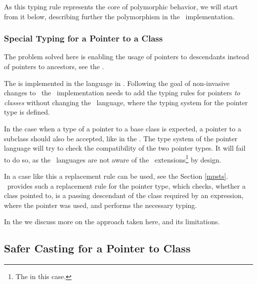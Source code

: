 As this typing rule represents the core of polymorphic behavior, we will start from it below, describing further the
polymorphism in the \pcpp\ implementation.

\subsubsection{Special Typing for a Pointer to a Class}
\label{pointertoclasstyping}

The problem solved here is enabling the usage of pointers to descendants instead of pointers to ancestors, see the
.


The   is implemented in the  language in \mbdr. 
Following the goal of non-invasive changes to \mbeddr\ the \pcpp\ implementation needs to add the 
typing rules for pointers \emph{to classes} without changing the    \mbdr\ language, where the 
typing system for the pointer type is defined.

In the case when a type of a pointer to a base class is expected, a pointer to a subclass should also be accepted, like
in the . The type system of the pointer language will try to check the compatibility of the two pointer types. It will
fail to do so, as the \mbdr\ languages are not aware of the \pcpp\ extensions\footnote{The   in this case.} 
by design.

In a case like this a replacement rule can be used, see the Section \ref{mpsts}. \pcpp\ provides such a replacement rule for the 
pointer type, which checks, whether a class pointed to, is a passing descendant of the class required by an expression, 
where the pointer was used, and performs the necessary typing.

In the  we discuss more on the approach taken here, and its limitations.

\subsection{Safer Casting for a Pointer to Class}
\label{safecasting}

\cppproblem

